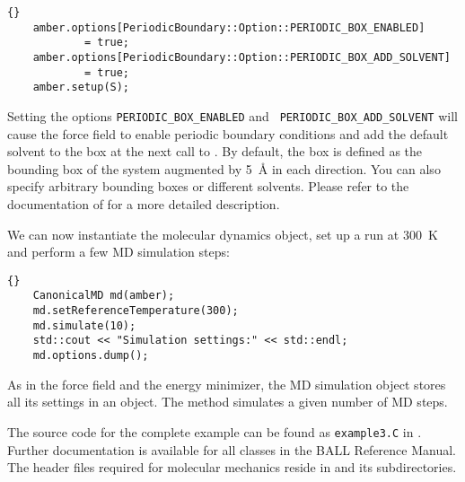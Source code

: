 \begin{lstlisting}{}
	amber.options[PeriodicBoundary::Option::PERIODIC_BOX_ENABLED] 
			= true;
	amber.options[PeriodicBoundary::Option::PERIODIC_BOX_ADD_SOLVENT] 
			= true;
	amber.setup(S);
\end{lstlisting}

\noindent
Setting the options {\tt PERIODIC\_BOX\_ENABLED} and {\tt
PERIODIC\_BOX\_ADD\_SOLVENT} will cause the force field to enable periodic
boundary conditions and add the default solvent to the box at the next call
to . By default, the box is defined as the bounding box of the
system augmented by 5~\AA{} in each direction. You can also specify arbitrary
bounding boxes or different solvents. Please refer to the documentation of
 for a more detailed description.

We can now instantiate the molecular dynamics object, set up a run at 300~K and
perform a few  MD simulation steps:

\begin{lstlisting}{}
	CanonicalMD md(amber);
	md.setReferenceTemperature(300);
	md.simulate(10);
	std::cout << "Simulation settings:" << std::endl;
	md.options.dump();
\end{lstlisting}

\noindent
As in the force field and the energy minimizer, the MD simulation object
stores all its settings in an  object. The
 method simulates a given number of MD
steps. 

The source code for the complete example can be found as {\tt example3.C}
in . Further documentation is available for all
classes in the BALL Reference Manual. The header files required for molecular
mechanics reside in  and its subdirectories.
